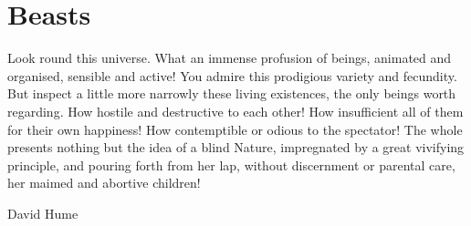 \chapter{Beasts}
\label{bestiary}

\epigraph{Look round this universe. What an immense profusion of beings, animated and organised, sensible and active! You admire this prodigious variety and fecundity. But inspect a little more narrowly these living existences, the only beings worth regarding. How hostile and destructive to each other! How insufficient all of them for their own happiness! How contemptible or odious to the spectator! The whole presents nothing but the idea of a blind Nature, impregnated by a great vivifying principle, and pouring forth from her lap, without discernment or parental care, her maimed and abortive children!}{David Hume}


